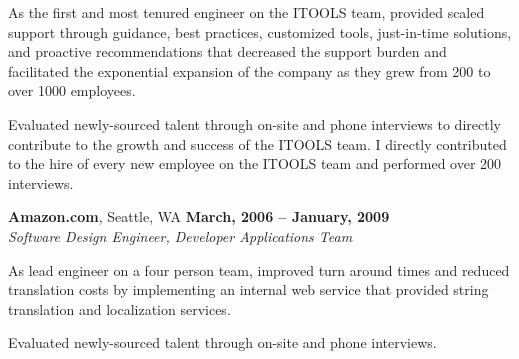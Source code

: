 \documentclass[margin,line]{resume}
\begin{document}
\begin{resume}
\begin{list2}
		As the first and most tenured engineer on the ITOOLS team, provided
		scaled support through guidance, best practices, customized tools,
		just-in-time solutions, and proactive recommendations that decreased
		the support burden and facilitated the exponential expansion of the
		company as they grew from 200 to over 1000 employees.
	\item
		Evaluated newly-sourced talent through on-site and phone interviews to
		directly contribute to the growth and success of the ITOOLS team.  I
		directly contributed to the hire of every new employee on the ITOOLS
		team and performed over 200 interviews.
	\end{list2}
	{\bf Amazon.com}, Seattle, WA   \hfill {\bf March, 2006 -- January, 2009}
	\vspace{1mm} \\ \vspace{1mm}
	{\sl Software Design Engineer, Developer Applications Team} %
	\begin{list2}
		\vspace*{1mm}
	\item
		As lead engineer on a four person team, improved turn around
                times and reduced translation costs by implementing an internal
                web service that provided string translation and localization
                services.
	\item
		Evaluated newly-sourced talent through on-site and phone interviews.
	\end{list2}


\end{resume}
\end{document}
